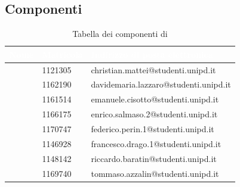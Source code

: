 \clearpage
\subsection{Componenti}
{
	\renewcommand{\arraystretch}{2}
	\begin{longtable}{ C{4cm} C{2cm} C{8cm} }
		\caption{Tabella dei componenti di \Gruppo{}}\\
		\textcolor{white}{\textbf{Nome}} & \textcolor{white}{\textbf{Matricola}} & \textcolor{white}{\textbf{Indirizzo di posta elettronica}}\\\endhead	
		
		\MC{} & 1121305 & christian.mattei@studenti.unipd.it \\
		\LD{} & 1162190 & davidemaria.lazzaro@studenti.unipd.it\\
		\CE{} & 1161514 & emanuele.cisotto@studenti.unipd.it\\
		\SE{} & 1166175 & enrico.salmaso.2@studenti.unipd.it \\
		\PF{} & 1170747 & federico.perin.1@studenti.unipd.it \\
		\DF{} & 1146928 & francesco.drago.1@studenti.unipd.it \\
		\BR{} & 1148142 & riccardo.baratin@studenti.unipd.it \\
		\AT{} & 1169740 & tommaso.azzalin@studenti.unipd.it \\
		
		
	\end{longtable}
}